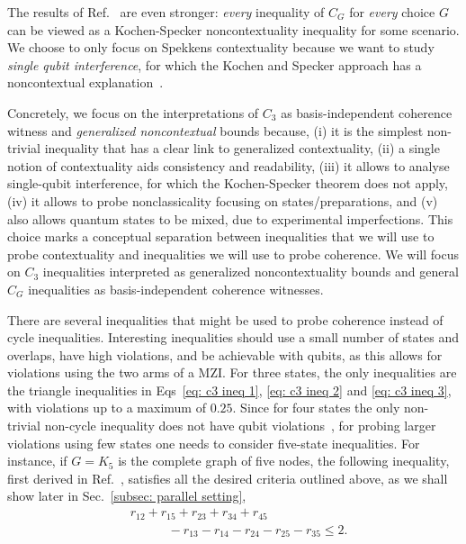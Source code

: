\documentclass[letterpaper,onecolumn,12pt,accepted=2024-01-17]{article}
\begin{document}
The results of Ref.~\cite{wagner2022inequalities} are even stronger: \textit{every} inequality of $C_G$ for \textit{every} choice $G$ can be viewed as a Kochen-Specker noncontextuality inequality for some scenario. We choose to only focus on Spekkens contextuality because we want to study \textit{single qubit interference}, for which the Kochen and Specker approach has a noncontextual explanation~\cite{KochenS67}. 

Concretely, we focus on the interpretations of $C_3$ as basis-independent coherence witness and \textit{generalized noncontextual} bounds because, (i) it is the simplest non-trivial inequality that has a clear link to generalized contextuality, (ii) a single notion of contextuality aids consistency and readability, (iii) it allows to analyse single-qubit interference, for which the Kochen-Specker theorem does not apply, (iv) { it allows } to probe nonclassicality focusing on states/preparations, and (v) {  also allows} quantum states to be mixed, due to experimental imperfections. This choice marks a conceptual separation between inequalities that we will use to probe contextuality and inequalities we will use to probe coherence. We will focus on $C_3$ inequalities interpreted as generalized noncontextuality bounds and general $C_G$ inequalities as basis-independent coherence witnesses. 

There are several inequalities that might be used to probe coherence instead of cycle inequalities. Interesting inequalities should use a small number of states and overlaps, have high violations, and be achievable with qubits, as this allows for violations using the two arms of a MZI. For three states, the only inequalities are the triangle inequalities in Eqs~\eqref{eq: c3 ineq 1}, \eqref{eq: c3 ineq 2} and \eqref{eq: c3 ineq 3},
with violations up to a maximum of $0.25$. Since for four states the only non-trivial non-cycle inequality does not have qubit violations~\cite{wagner2022inequalities}, for probing larger violations using few states one needs to consider five-state inequalities. For instance, if $G = K_5$ is the complete graph of five nodes, the following inequality{, first derived in Ref.~\cite{wagner2022inequalities},} satisfies all the desired criteria { outlined above}, as we shall show later { in Sec.~\ref{subsec: parallel setting}},
\begin{align}
    &r_{12}+r_{15}+r_{23}+r_{34}+r_{45}\nonumber\\
    &\hspace{3em}-r_{13}-r_{14}-r_{24}-r_{25}-r_{35}\leq 2. \label{eq: inequality (d)}
\end{align}
\end{document}
